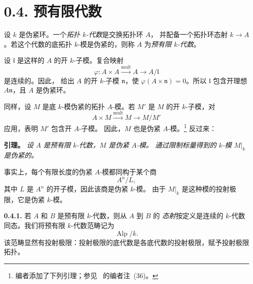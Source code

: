 
\section*{0.4. 预有限代数}
\label{sga3:VIIB:0.4}

设 \(k\) 是伪紧环。一个\emph{拓扑 \(k\)-代数}是交换拓扑环 \(A\)，
并配备一个拓扑环态射 \(k\to A\)。若这个代数的底拓扑
\(k\)-模是伪紧的，则称 \(A\) 为\emph{预有限 \(k\)-代数}。

设 \(\mathfrak l\) 是这样的 \(A\) 的开 \(k\)-子模。复合映射
\[
  \varphi:
  A\times A
  \xrightarrow{\mathrm{mult}}A
  \longrightarrow A/\mathfrak l
\]
是连续的。因此， 给出 \(A\) 的开 \(k\)-子模
\(\mathfrak n\)，使 \(\varphi(A\times\mathfrak n)=0\)。所以
\(\mathfrak l\) 包含开理想 \(A\mathfrak n\)，且 \(A\) 是伪紧环。

同样，设 \(M\) 是底 \(k\)-模伪紧的拓扑 \(A\)-模。若 \(M'\) 是
\(M\) 的开 \(k\)-子模，对
\[
  A\times M
  \xrightarrow{\mathrm{mult}}M
  \longrightarrow M/M'
\]
应用，表明 \(M'\) 包含开 \(A\)-子模。
因此，\(M\) 也是伪紧 \(A\)-模。\footnote{编者添加了下列引理；参见\
 的编者注~(36)。}
反过来：

\medskip
\noindent\textbf{引理。}
\label{sga3:VIIB:0.4-restriction-lemma}
\textit{设 \(A\) 是预有限 \(k\)-代数，\(M\) 是伪紧 \(A\)-模。
通过限制标量得到的 \(k\)-模 \(M|_k\) 是伪紧的。}

事实上，每个有限长度的伪紧 \(A\)-模都同构于某个商
\[
  A^n/L,
\]
其中 \(L\) 是 \(A^n\) 的开子模，因此该商是伪紧 \(k\)-模。
由于 \(M|_k\) 是这种模的投射极限，它是伪紧 \(k\)-模。

\medskip
\noindent\textbf{0.4.1.}
\label{sga3:VIIB:0.4.1}
若 \(A\) 和 \(B\) 是预有限 \(k\)-代数，则从 \(A\) 到 \(B\) 的
\emph{态射}按定义是连续的 \(k\)-代数同态。我们将预有限 \(k\)-代数范畴记为
\[
  \operatorname{Alp}/k.
\]
该范畴显然有投射极限：投射极限的底代数是各底代数的投射极限，赋予投射极限拓扑。

